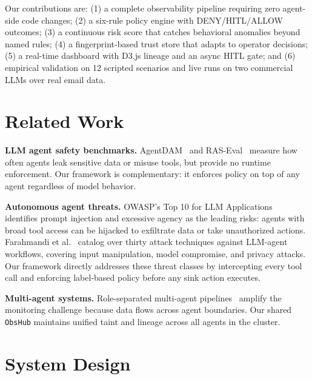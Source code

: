\documentclass{article} %
\theoremstyle{plain}
\theoremstyle{definition}
\theoremstyle{remark}
\begin{document}
Our contributions are: (1) a complete observability pipeline requiring zero
agent-side code changes; (2) a six-rule policy engine with DENY/HITL/ALLOW
outcomes; (3) a continuous risk score that catches behavioral anomalies beyond
named rules; (4) a fingerprint-based trust store that adapts to operator
decisions; (5) a real-time dashboard with D3.js lineage and an async HITL
gate; and (6) empirical validation on 12 scripted scenarios and live runs on
two commercial LLMs over real email data.

\vspace{-1.2em}
\section{Related Work}
\vspace{-0.7em}

\textbf{LLM agent safety benchmarks.}
AgentDAM~\citep{zharmagambetov2025agentdam} and
RAS-Eval~\citep{fu2025rasevalcomprehensivebenchmarksecurity} measure how
often agents leak sensitive data or misuse tools, but provide no runtime
enforcement. Our framework is complementary: it enforces policy on top of
any agent regardless of model behavior.

\vspace{-0.3em}
\textbf{Autonomous agent threats.}
OWASP's Top 10 for LLM Applications~\citep{owasp2025llm} identifies prompt
injection and excessive agency as the leading risks: agents with broad tool
access can be hijacked to exfiltrate data or take unauthorized actions.
Farahmandi et al.~\citep{farahmandi2025threats} catalog over thirty attack
techniques against LLM-agent workflows, covering input manipulation, model
compromise, and privacy attacks. Our framework directly addresses these
threat classes by intercepting every tool call and enforcing label-based
policy before any sink action executes.

\vspace{-0.3em}
\textbf{Multi-agent systems.}
Role-separated multi-agent pipelines~\citep{anthropic2024agents} amplify the
monitoring challenge because data flows across agent boundaries. Our shared
\texttt{ObsHub} maintains unified taint and lineage across all agents in the cluster.

\vspace{-1em}
\section{System Design}
\vspace{-0.5em}
\end{document}
